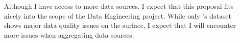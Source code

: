 \documentclass[sigconf, natbib=true]{acmart}
\begin{document}
Although I have access to more data sources, I expect that this proposal fits nicely into the scope of the Data Engineering project.
While only \citeauthor{evanhallmark}'s dataset shows major data quality issues on the surface, I expect that I will encounter more issues when aggregating data sources.


\def\bibfont{\small} %
 
\end{document}
